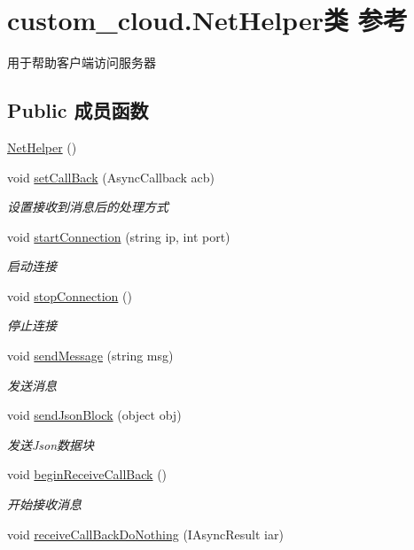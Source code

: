 \hypertarget{classcustom__cloud_1_1_net_helper}{}\section{custom\+\_\+cloud.\+Net\+Helper类 参考}
\label{classcustom__cloud_1_1_net_helper}


用于帮助客户端访问服务器  


\subsection*{Public 成员函数}
\begin{DoxyCompactItemize}
\item 
\hyperlink{classcustom__cloud_1_1_net_helper_a19693e7d58749390dcfd6a702cc6874a}{Net\+Helper} ()
\item 
void \hyperlink{classcustom__cloud_1_1_net_helper_ab3ecd4928c1b169fe97e7f3acd61a602}{set\+Call\+Back} (Async\+Callback acb)
\begin{DoxyCompactList}\small\item\em 设置接收到消息后的处理方式 \end{DoxyCompactList}\item 
void \hyperlink{classcustom__cloud_1_1_net_helper_afd7ac9d62a31b4f294abaa213d0c1d4e}{start\+Connection} (string ip, int port)
\begin{DoxyCompactList}\small\item\em 启动连接 \end{DoxyCompactList}\item 
void \hyperlink{classcustom__cloud_1_1_net_helper_aedc77c2aeaff0081b3e994e752867e76}{stop\+Connection} ()
\begin{DoxyCompactList}\small\item\em 停止连接 \end{DoxyCompactList}\item 
void \hyperlink{classcustom__cloud_1_1_net_helper_a37581b33a0126737316ef7e40e3a1dd5}{send\+Message} (string msg)
\begin{DoxyCompactList}\small\item\em 发送消息 \end{DoxyCompactList}\item 
void \hyperlink{classcustom__cloud_1_1_net_helper_afadabaa5d54d445125691d4de3743c6f}{send\+Json\+Block} (object obj)
\begin{DoxyCompactList}\small\item\em 发送\+Json数据块 \end{DoxyCompactList}\item 
void \hyperlink{classcustom__cloud_1_1_net_helper_a774419d55edcc9265eef02db753c1572}{begin\+Receive\+Call\+Back} ()
\begin{DoxyCompactList}\small\item\em 开始接收消息 \end{DoxyCompactList}\item 
void \hyperlink{classcustom__cloud_1_1_net_helper_a71e4dbcc7b20b4c593b41ebd462f62b9}{receive\+Call\+Back\+Do\+Nothing} (I\+Async\+Result iar)
\end{DoxyCompactItemize}
